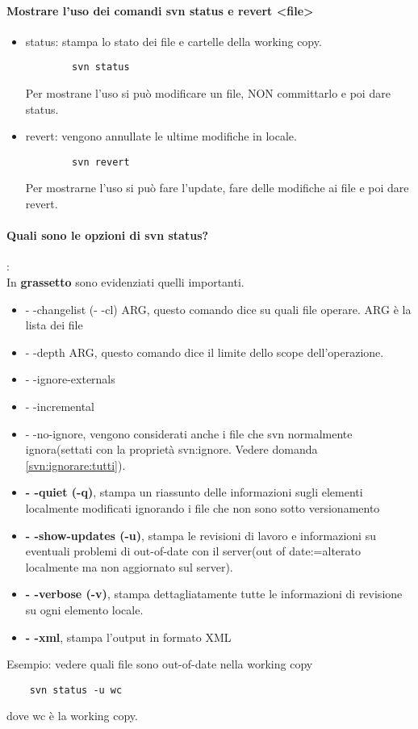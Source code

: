 \documentclass[a4paper]{article}
\begin{document}
	\paragraph{Mostrare l'uso dei comandi svn status e revert <file>}
	\begin{itemize}
		\item status: stampa lo stato dei file e cartelle della working copy.
		\begin{verbatim}
		svn status
		\end{verbatim}
		Per mostrane l'uso si può modificare un file, NON committarlo e poi dare status.
		\item revert: vengono annullate le ultime modifiche in locale.
		\begin{verbatim}
		svn revert
		\end{verbatim}
		Per mostrarne l'uso si può fare l'update, fare delle modifiche ai file e poi dare revert.
	\end{itemize}
	\paragraph{Quali sono le opzioni di svn status?}: \\
	In \textbf{grassetto} sono evidenziati quelli importanti.
	\begin{itemize}
		
		
		\item - -changelist (- -cl) ARG, questo comando dice su quali file operare. ARG è la lista dei file
		\item - -depth ARG, questo comando dice il limite dello scope dell'operazione.
		\item - -ignore-externals
		\item - -incremental
		\item - -no-ignore, vengono considerati anche i file che svn normalmente ignora(settati con la proprietà svn:ignore. Vedere domanda \ref{svn:ignorare:tutti}).
		\item \textbf{- -quiet (-q)}, stampa un riassunto delle informazioni sugli elementi localmente modificati
		ignorando i file che non sono sotto versionamento
		\item \textbf{- -show-updates (-u)}, stampa le revisioni di lavoro e informazioni su eventuali problemi di out-of-date con il server(out of date:=alterato localmente ma non aggiornato sul server).
		\item \textbf{- -verbose (-v)}, stampa dettagliatamente tutte le informazioni di revisione su ogni elemento locale.
		\item \textbf{- -xml}, stampa l'output in formato XML 
		
	\end{itemize}
	Esempio: vedere quali file sono out-of-date nella working copy
	\begin{verbatim}
	svn status -u wc
	\end{verbatim}
	dove wc è la working copy.
\end{document}
